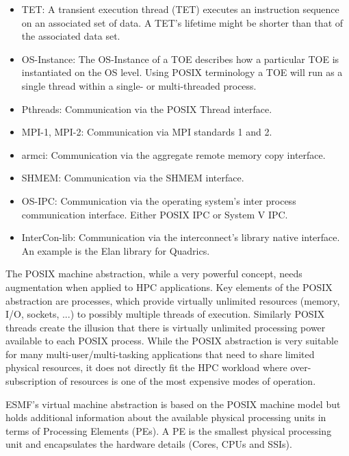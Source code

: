 \begin{itemize}
\item TET: A transient execution thread (TET) executes an instruction sequence on an associated set of data. A TET's lifetime might be shorter than that of the associated data set.

\item OS-Instance: The OS-Instance of a TOE describes how a particular TOE is instantiated on the OS level. Using POSIX terminology a TOE will run as a single thread within a single- or multi-threaded process.

\item Pthreads: Communication via the POSIX Thread interface.

\item MPI-1, MPI-2: Communication via MPI standards 1 and 2.

\item armci: Communication via the aggregate remote memory copy interface.

\item SHMEM: Communication via the SHMEM interface.

\item OS-IPC: Communication via the operating system's inter process communication interface. Either POSIX IPC or System V IPC.

\item InterCon-lib: Communication via the interconnect's library native interface. An example is the Elan library for Quadrics.

\end{itemize}

The POSIX machine abstraction, while a very powerful concept, needs augmentation when applied to HPC applications. Key elements of the POSIX abstraction are processes, which provide virtually unlimited resources (memory, I/O, sockets, ...) to possibly multiple threads of execution. Similarly POSIX threads create the illusion that there is virtually unlimited processing power available to each POSIX process. While the POSIX abstraction is very suitable for many multi-user/multi-tasking applications that need to share limited physical resources, it does not directly fit the HPC workload where over-subscription of resources is one of the most expensive modes of operation.

ESMF's virtual machine abstraction is based on the POSIX machine model but holds additional information about the available physical processing units in terms of Processing Elements (PEs). A PE is the smallest physical processing unit and encapsulates the hardware details (Cores, CPUs and SSIs).


